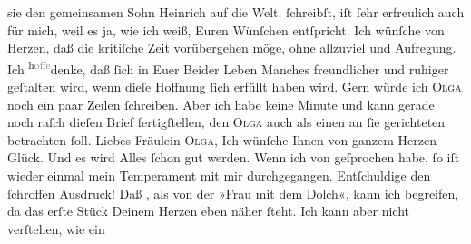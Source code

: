 \begin{ledgroupsized}[t]{13cm}
{{{                  sie den gemeinsamen Sohn Heinrich auf die
                  Welt.}}}\label{K_L03097-2h} ſchreibſt, iſt ſehr erfreulich auch für mich, weil es ja, wie ich
               weiß, Euren Wünſchen entſpricht. Ich wünſche von Herzen, daß die kritiſche Zeit
               vorübergehen möge, ohne  allzuviel \label{K_L03097-3v}\label{K_L03097-3h} und Aufregung. Ich \substVorne{}\textsuperscript{h\textcolor{gray}{offe}}\substDazwischen{}denke\substHinten{}, daß ſich in Euer Beider Leben Manches freundlicher {\pb}und ruhiger geſtalten wird, wenn dieſe Hoffnung ſich
               erfüllt haben wird. Gern würde ich \textsc{Olga} noch ein paar
               Zeilen ſchreiben. Aber ich habe keine Minute und kann gerade noch raſch dieſen Brief
               fertigſtellen, den \textsc{Olga} auch als einen an ſie gerichteten
               betrachten ſoll. Liebes Fräulein \textsc{Olga}, Ich wünſche Ihnen
               von ganzem Herzen Glück. Und es wird Alles ſchon gut werden.\pend
           \pstart
           Wenn ich von \label{K_L03097-4v}\label{K_L03097-4h} geſprochen habe, ſo iſt wieder einmal mein Temperament mit mir durchgegangen.
               Entſchuldige den ſchroffen {\pb}Ausdruck! Daß \label{K_L03097-5v}\label{K_L03097-5h}, als von der »Frau mit dem Dolch«, kann
               ich begreifen, da das erſte Stück Deinem Herzen eben näher ſteht. Ich kann aber nicht verſtehen, wie ein

\end{ledgroupsized}
